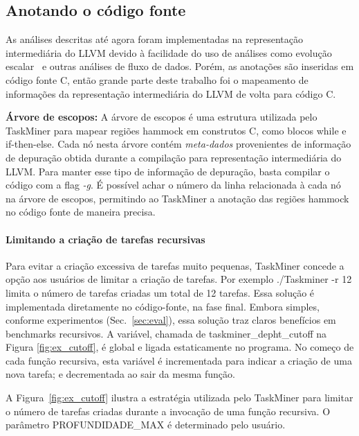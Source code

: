 \documentclass[sigplan,10pt,review]{acmart}
\newcommand\Taskminer{\mbox{\textsf{TaskMiner}}}
\begin{document}
\subsection{Anotando o código fonte}
\label{sub:ir}

As análises descritas até agora foram implementadas na representação intermediária
do LLVM devido à facilidade do uso de análises como evolução escalar~\cite[p.18]{Grosser12} e outras
análises de fluxo de dados.
Porém, as anotações são inseridas em código fonte C, então grande
parte deste trabalho foi o mapeamento de informações da representação intermediária do LLVM de volta
para código C.

\noindent
\textbf{Árvore de escopos:}
A árvore de escopos é uma estrutura utilizada pelo {\Taskminer} para mapear regiões hammock em construtos C, como blocos
\textsf{while} e \textsf{if-then-else}. Cada nó nesta árvore contém {\em meta-dados}
provenientes de informação de depuração obtida durante a compilação para representação
intermediária do LLVM. Para manter esse tipo de informação de depuração, basta compilar o código com a flag
{\em -g}.
É possível achar o número da linha relacionada à cada nó na árvore de escopos, permitindo
ao {\Taskminer} a anotação das regiões hammock no código fonte de maneira precisa.

\paragraph{Limitando a criação de tarefas recursivas}
Para evitar a criação excessiva de tarefas muito pequenas, {\Taskminer} concede a opção
aos usuários de limitar a criação de tarefas. Por exemplo \textsf{./Taskminer -r 12} limita o número
de tarefas criadas um total de 12 tarefas. Essa solução é implementada diretamente no código-fonte,
na fase final. Embora simples, conforme experimentos (Sec.~\ref{sec:eval}), essa solução traz claros
benefícios em benchmarks recursivos. A variável, chamada de \textsf{taskminer\_depht\_cutoff} na Figura
\ref{fig:ex_cutoff}, é global e ligada estaticamente no programa. No começo de cada função recursiva,
esta variável é incrementada para indicar a criação de uma nova tarefa; e decrementada ao sair da mesma função.

\begin{example}
A Figura~\ref{fig:ex_cutoff} ilustra a estratégia utilizada pelo {\Taskminer} para limitar
o número de tarefas criadas durante a invocação de uma função recursiva.
O parâmetro \textsf{PROFUNDIDADE\_MAX} é determinado pelo usuário.
\end{example}
\end{document}
